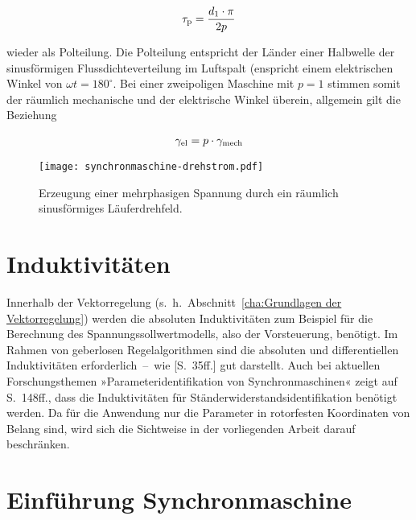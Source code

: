 \begin{align}
\tau_{\mathrm{p}} = \frac{d_{\mathrm{1}} \cdot \pi}{2p}
\end{align}

wieder als Polteilung.
Die Polteilung entspricht der Länder einer Halbwelle der sinusförmigen Flussdichteverteilung im Luftspalt (enspricht einem elektrischen Winkel von $\omega t = 180^{\circ}$.
Bei einer zweipoligen Maschine mit $p=1$ stimmen somit der räumlich mechanische und der elektrische Winkel überein, allgemein gilt die Beziehung \autocite[S.141f.]{fischer2009}

\begin{align}
\gamma_{\mathrm{el}} = p\cdot \gamma_{\mathrm{mech}}
\end{align}

\begin{figure}[!htb]
\centering
\texttt{[image: synchronmaschine-drehstrom.pdf]}
\label{fig:drehstromwicklung}
\caption{Erzeugung einer mehrphasigen Spannung durch ein räumlich sinusförmiges Läuferdrehfeld.}
\end{figure}

\section{Induktivitäten}\label{sec:induktiv}

Innerhalb der Vektorregelung (s.~h.~Abschnitt~\ref{cha:Grundlagen der Vektorregelung}) werden die absoluten Induktivitäten zum Beispiel für die Berechnung des Spannungssollwertmodells, also der Vorsteuerung, benötigt.
Im Rahmen von geberlosen Regelalgorithmen sind die absoluten und differentiellen Induktivitäten erforderlich~--~wie \autocite{kellner2012}[S.~35ff.] gut darstellt.
Auch bei aktuellen Forschungsthemen »Parameteridentifikation von Synchronmaschinen« zeigt \autocite{kellner2012} auf S.~148ff., dass die Induktivitäten für Ständerwiderstandsidentifikation benötigt werden.
Da für die Anwendung nur die Parameter in rotorfesten Koordinaten von Belang sind, wird sich die Sichtweise in der vorliegenden Arbeit darauf beschränken.
 

\section{Einführung Synchronmaschine}\label{sec:synchron}

